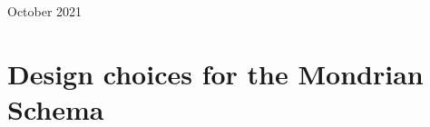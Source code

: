 \documentclass[runningheads]{llncs}
\begin{document}
\begin{titlepage}
	\vspace{10em}
	\begin{abstract}
	    This paper describes the design process of a multidimensional model for analyzing data coming from the Open Food Facts platform. It aims to find an efficient solution to support Online Analytical Processes (OLAP). We can divide the followed approach into three main steps. Firstly, a design phase (sections \ref{design} and \ref{ER}) — i.e., UML modeling \cite{UML} and ER schema design \cite{ER}. Secondly, an implementation stage (sections \ref{ER} and \ref{kettle}) — i.e., SQL code to physically implement the ER schema \cite{SQL} and Kettle transformations to populate it \cite{Kettle_dim}\cite{Kettle_fact}. Finally, a querying process followed by some analysis (sections \ref{queries} and \ref{results}) — i.e., MDX queries design \cite{MDX} and discussion of the results obtained.
	\end{abstract}
	
	
	
	\vfill\vfill\vfill %
	
	{\large October 2021} %
	
	
	 
	
	\vfill %
	
\end{titlepage}
\newpage
\section{Design choices for the Mondrian Schema}\label{design}
\end{document}
